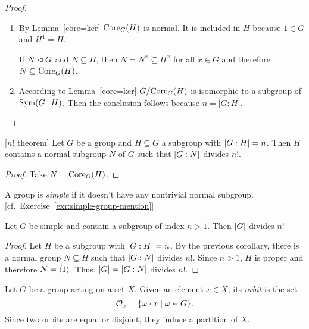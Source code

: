 \begin{proof}${}$

\begin{enumerate}[\rm a)]
    \item By {\rm Lemma~\ref{core=ker}} ${\rm Core}_G(H)$ is normal. It is included in $H$ because $1\in G$ and $H^1=H$.
    
    If $N\lhd G$ and $N\subseteq H$, then $N=N^x\subseteq H^x$ for all $x\in G$ and therefore $N\subseteq{\rm Core}_G(H)$.

    \item According to {\rm Lemma~\ref{core=ker}} $G/{\rm Core}_G(H)$ is isomorphic to a subgroup of\/ ${\rm Sym}(G\mathbin:H)$. Then the conclusion follows because $n=|G:H|$.
\end{enumerate}
\end{proof}

\begin{cor}\label{n!-theorem}{\rm[$n!$ theorem]}
    Let $G$ be a group and\/ $H \subseteq G$ a subgroup with $\left\vert{G:H}\right\vert = n$. Then $H$ contains a normal subgroup\/ $N$ of\/ $G$ such that $\left\vert{G:N}\right\vert$ divides $n!$.
\end{cor}

\begin{proof} Take $N={\rm Core}_G(H)$.  \end{proof}

\begin{defn}
    A group is \textsl{simple} if it doesn't have any nontrivial normal subgroup.  {\rm[cf.~Exercise~\ref{exr:simple-group-mention}]}
\end{defn}

\begin{cor}\label{oreder-divide-n!}
    Let $G$ be simple and contain a subgroup of index $n > 1$. Then $\left\vert{G}\right\vert$ divides $n!$
\end{cor}

\begin{proof} Let $H$ be a subgroup with $\left\vert{G:H}\right\vert=n$. By the previous corollary, there is a normal group $N\subseteq H$ such that $\left\vert{G:N}\right\vert$ divides $n!$. Since $n>1$, $H$ is proper and therefore $N=\langle1\rangle$. Thus, $\left\vert{G}\right\vert=\left\vert{G:N}\right\vert$ divides $n!$.
\end{proof}

\begin{defn}
    Let\/ $G$ be a group acting on a set $X$. Given an element $x\in X$, its \textsl{orbit} is the set
    $$
        {\cal O}_x = \{\omega\cdot x\mid \omega\in G\}. 
    $$
    Since two orbits are equal or disjoint, they induce a partition of\/ $X$.
\end{defn}

